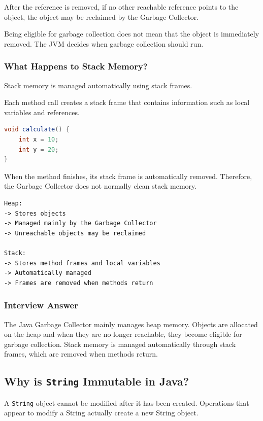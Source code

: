 \documentclass[12pt,a4paper]{article}
\begin{document}
After the reference is removed, if no other reachable reference points to
the object, the object may be reclaimed by the Garbage Collector.

Being eligible for garbage collection does not mean that the object is
immediately removed. The JVM decides when garbage collection should run.

\subsubsection*{What Happens to Stack Memory?}

Stack memory is managed automatically using stack frames.

Each method call creates a stack frame that contains information such as
local variables and references.

\begin{lstlisting}[language=Java]
void calculate() {
    int x = 10;
    int y = 20;
}
\end{lstlisting}

When the method finishes, its stack frame is automatically removed.
Therefore, the Garbage Collector does not normally clean stack memory.

\begin{verbatim}
Heap:
-> Stores objects
-> Managed mainly by the Garbage Collector
-> Unreachable objects may be reclaimed

Stack:
-> Stores method frames and local variables
-> Automatically managed
-> Frames are removed when methods return
\end{verbatim}

\subsubsection*{Interview Answer}

The Java Garbage Collector mainly manages heap memory. Objects are allocated
on the heap and when they are no longer reachable, they become eligible for
garbage collection. Stack memory is managed automatically through stack
frames, which are removed when methods return.

\subsection{Why is \texttt{String} Immutable in Java?}

A \texttt{String} object cannot be modified after it has been created.
Operations that appear to modify a String actually create a new String
object.
\end{document}
